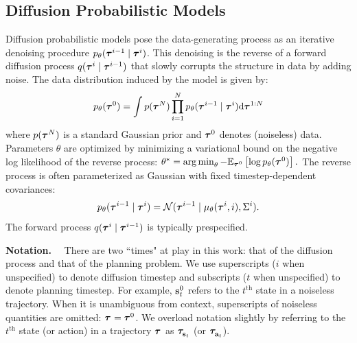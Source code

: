 \subsection{Diffusion Probabilistic Models}
\label{sec:background_diffusion}
Diffusion probabilistic models \citep{sohldickstein2015nonequilibrium,ho2020denoising} pose the data-generating process as an iterative denoising procedure $p_\theta(\bm{\tau}^{i-1} \mid \bm{\tau}^{i})$.
This denoising is the reverse of a forward diffusion process $q(\bm{\tau}^{i} \mid \bm{\tau}^{i-1})$ that slowly corrupts the structure in data by adding noise.
The data distribution induced by the model is given by:
\[
p_\theta(\bm{\tau}^{0}) =
\int p(\bm{\tau}^{N}) \prod_{i=1}^{N} p_\theta(\bm{\tau}^{i-1} \mid \bm{\tau}^{i}) \mathrm{d} \bm{\tau}^{1:N}
\]
where $p(\bm{\tau}^{N})$ is a standard Gaussian prior and $\bm{\tau}^{0}$ denotes (noiseless) data.
Parameters $\theta$ are optimized by minimizing a variational bound on the negative log likelihood of the reverse process:
$
\theta^* = \operatorname*{arg\,min}_{\theta}
-\mathbb{E}_{\bm{\tau}^{0}} \left[ \log p_\theta(\bm{\tau}^{0}) \right].
$
The reverse process is often parameterized as Gaussian with fixed timestep-dependent covariances:
\[
p_\theta(\bm{\tau}^{i-1} \mid \bm{\tau}^{i}) = \mathcal{N}(\bm{\tau}^{i-1} \mid \mu_\theta(\bm{\tau}^{i}, i), \Sigma^i).
\]
The forward process $q(\bm{\tau}^{i} \mid \bm{\tau}^{i-1})$ is typically prespecified.

\textbf{Notation.}~~
There are two ``times" at play in this work: that of the diffusion process and that of the planning problem.
We use superscripts ($i$ when unspecified) to denote diffusion timestep and subscripts ($t$ when unspecified) to denote planning timestep.
For example, $\mathbf{s}_t^{0}$ refers to the $t^{\text{th}}$ state in a noiseless trajectory.
When it is unambiguous from context, superscripts of noiseless quantities are omitted: $\bm{\tau}^{} = \bm{\tau}^{0}$.
We overload notation slightly by referring to the $t^\text{th}$ state (or action) in a trajectory $\bm{\tau}^{}$ as $\bm{\tau}^{}_{\mathbf{s}_t}$ (or $\bm{\tau}^{}_{\mathbf{a}_t}$).
